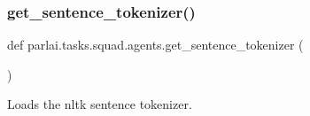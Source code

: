 \subsubsection{\texorpdfstring{get\+\_\+sentence\+\_\+tokenizer()}{get\_sentence\_tokenizer()}}
{\footnotesize\ttfamily def parlai.\+tasks.\+squad.\+agents.\+get\+\_\+sentence\+\_\+tokenizer (\begin{DoxyParamCaption}{ }\end{DoxyParamCaption})}

\begin{DoxyVerb}Loads the nltk sentence tokenizer.
\end{DoxyVerb}
 